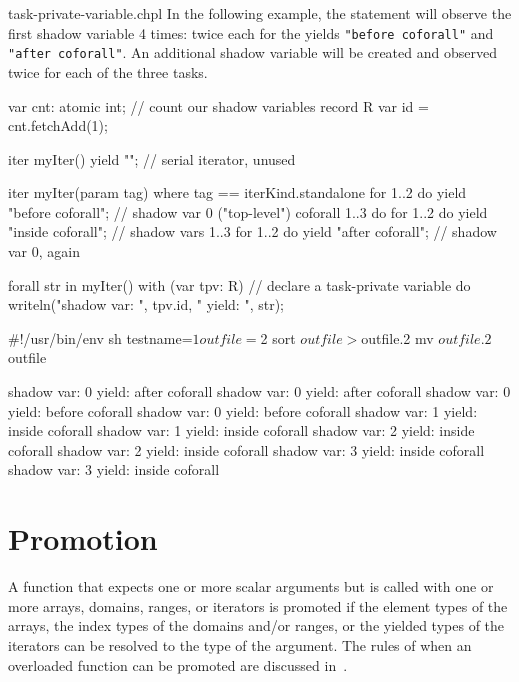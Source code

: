 \begin{chapelexample}{task-private-variable.chpl}
In the following example, the  statement will observe
the first shadow variable 4 times: twice each for the yields
{\tt "before coforall"} and {\tt "after coforall"}.
An additional shadow variable will be created and observed twice
for each of the three  tasks.
\begin{chapel}
var cnt: atomic int;                     // count our shadow variables
record R { var id = cnt.fetchAdd(1); }

iter myIter() { yield ""; }              // serial iterator, unused

iter myIter(param tag) where tag == iterKind.standalone {
  for 1..2 do
    yield "before coforall";             // shadow var 0 ("top-level")
  coforall 1..3 do
    for 1..2 do
      yield "inside coforall";           // shadow vars 1..3
  for 1..2 do
    yield "after coforall";              // shadow var 0, again
}

forall str in myIter()
  with (var tpv: R)                      // declare a task-private variable
do
  writeln("shadow var: ", tpv.id, "  yield: ", str);
\end{chapel}
\begin{chapelprediff}
\#!/usr/bin/env sh
testname=$1
outfile=$2
sort $outfile > $outfile.2
mv $outfile.2 $outfile
\end{chapelprediff}
\begin{chapeloutput}
shadow var: 0  yield: after coforall
shadow var: 0  yield: after coforall
shadow var: 0  yield: before coforall
shadow var: 0  yield: before coforall
shadow var: 1  yield: inside coforall
shadow var: 1  yield: inside coforall
shadow var: 2  yield: inside coforall
shadow var: 2  yield: inside coforall
shadow var: 3  yield: inside coforall
shadow var: 3  yield: inside coforall
\end{chapeloutput}
\end{chapelexample}


\section{Promotion}
\label{Promotion}

A function that expects one or more scalar arguments but is called
with one or more arrays, domains, ranges, or iterators is promoted if
the element types of the arrays, the index types of the domains and/or
ranges, or the yielded types of the iterators can be resolved to the
type of the argument.  The rules of when an overloaded function can be
promoted are discussed in~.

